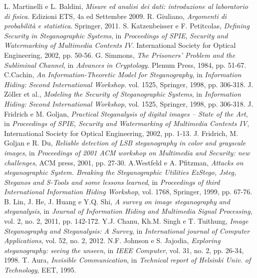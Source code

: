 \begin{thebibliography}{}
L. Martinelli e L. Baldini,
\textit{Misure ed analisi dei dati: introduzione al laboratorio di fisica}. 
Edizioni ETS, 4a ed Settembre 2009.
R. Giuliano, \textit{Argomenti di probabilità e statistica}. Springer, 2011.
S. Katzenbeisser e F. Petitcolas, \textit{Defining Security in Steganographic Systems}, in \textit{Proceedings of SPIE}, \textit{Security and Watermarking of Multimedia Contents IV}. International Society for Optical Engineering, 2002, pp. 50-56.
G. Simmons, \textit{The Prisoners' Problem and the Subliminal Channel}, in \textit{Advances in Cryptology}. Plenum Press, 1984, pp. 51-67.
C.Cachin, \textit{An Information-Theoretic Model for Steganography}, in \textit{Information Hiding: Second International Workshop}. vol. 1525, Springer, 1998, pp. 306-318.
J. Z\"oller et al., \textit{Modeling the Security of Steganographic Systems}, in \textit{Information Hiding: Second International Workshop}, vol. 1525, Springer, 1998, pp. 306-318.
J. Fridrich e M. Goljan, \textit{Practical Steganalysis of digital images – State of the Art}, in \textit{Proceedings of SPIE, Security and Watermarking of Multimedia Contents IV}, International Society for Optical Engineering, 2002, pp. 1-13.
J. Fridrich, M. Goljan e R. Du, \textit{Reliable detection of LSB steganography in color and grayscale images}, in \textit{Proceedings of 2001 ACM workshop on Multimedia and Security: new challenges}, ACM press, 2001, pp. 27-30.
A.Westfeld e A. Pfitzman, \textit{Attacks on steganographic System. Breaking the Steganographic Utilities EzStego, Jsteg, Steganos and S-Tools and some lessons learned}, in \textit{Proceedings of third International Information Hiding Workshop}, vol. 1768, Springer, 1999, pp. 67-76.
B. Lin, J. He, J. Huang e Y.Q. Shi, \textit{A survey on image steganography and steganalysis}, in \textit{Journal of Information
Hiding and Multimedia Signal Processing}, vol. 2, no. 2, 2011, pp. 142-172.
Y.J. Chanu, Kh.M. Singh e T. Tuithung, \textit{Image Steganography and Steganalysis: A Survey}, in \textit{International journal of Computer Applications}, vol. 52, no. 2, 2012.
N.F. Johnson e S. Jajodia, \textit{Exploring steganography: seeing the unseen}, in \textit{IEEE Computer}, vol. 31, no. 2, pp. 26-34, 1998.
T. Aura, \textit{Invisible Communication}, in \textit{Technical report of Helsinki Univ. of Technology}, EET, 1995.

\end{thebibliography}
